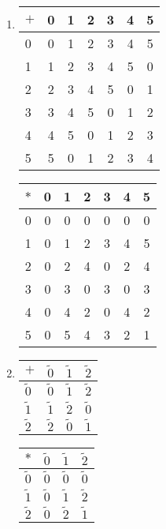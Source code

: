 \documentclass[12pt]{report}
\begin{document}
\sol
\begin{enumerate}[label=\alph*.]
    \item \begin{tabular}{l | c c c c c c}
        $+$ & 0 & 1 & 2 & 3 & 4 & 5 \\
        \hline
        0 & 0 & 1 & 2 & 3 & 4 & 5 \\
        1 & 1 & 2 & 3 & 4 & 5 & 0 \\
        2 & 2 & 3 & 4 & 5 & 0 & 1 \\
        3 & 3 & 4 & 5 & 0 & 1 & 2 \\
        4 & 4 & 5 & 0 & 1 & 2 & 3 \\
        5 & 5 & 0 & 1 & 2 & 3 & 4
    \end{tabular}
    \quad
    \begin{tabular}{l | c c c c c c}
        $*$ & 0 & 1 & 2 & 3 & 4 & 5 \\
        \hline
        0 & 0 & 0 & 0 & 0 & 0 & 0\\
        1 & 0 & 1 & 2 & 3 & 4 & 5\\
        2 & 0 & 2 & 4 & 0 & 2 & 4\\
        3 & 0 & 3 & 0 & 3 & 0 & 3\\
        4 & 0 & 4 & 2 & 0 & 4 & 2\\
        5 & 0 & 5 & 4 & 3 & 2 & 1
    \end{tabular}
    \item     \begin{tabular}{l | c c c }
        $+$ & $\widetilde{0}$ & $\widetilde{1}$ & $\widetilde{2}$ \\
        \hline
       $\widetilde{0}$ & $\widetilde{0}$ & $\widetilde{1}$ &$ \widetilde{2}$ \\
       $\widetilde{1}$ & $\widetilde{1}$ & $\widetilde{2}$ & $\widetilde{0}$ \\
       $\widetilde{2}$ & $\widetilde{2}$ & $\widetilde{0}$ & $\widetilde{1}$
    \end{tabular}
    \quad
    \begin{tabular}{l | c c c }
        $*$ & $\widetilde{0}$ & $\widetilde{1}$ & $\widetilde{2}$ \\
        \hline
       $\widetilde{0}$ & $\widetilde{0}$ & $\widetilde{0}$ & $\widetilde{0}$ \\
      $ \widetilde{1}$ & $\widetilde{0}$ & $\widetilde{1}$ & $\widetilde{2} $\\
      $ \widetilde{2}$ & $\widetilde{0}$ & $\widetilde{2}$ & $\widetilde{1}$
    \end{tabular}
\end{enumerate}
\end{document}

